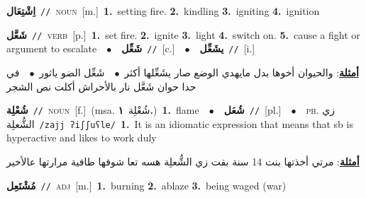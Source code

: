 \documentclass[10pt,a4paper,twoside]{article} %
\begin{document}
\begin{multicols}{2}
{\setlength\topsep{0pt}\textbf{\foreignlanguage{arabic}{اِشْتِعَال}}\ {\color{gray}\texttt{//}\color{black}}\ \textsc{noun}\ [m.]\ \textbf{1.}~setting fire.  \textbf{2.}~kindling  \textbf{3.}~igniting  \textbf{4.}~ignition\ } \vspace{2mm}

{\setlength\topsep{0pt}\textbf{\foreignlanguage{arabic}{شَعَّل}}\ {\color{gray}\texttt{//}\color{black}}\ \textsc{verb}\ [p.]\ \textbf{1.}~set fire.  \textbf{2.}~ignite  \textbf{3.}~light  \textbf{4.}~switch on.  \textbf{5.}~cause a fight or argument to escalate\ \ $\bullet$\ \ \setlength\topsep{0pt}\textbf{\foreignlanguage{arabic}{شَعِّل}}\ {\color{gray}\texttt{//}\color{black}}\ [c.]\ \ $\bullet$\ \ \setlength\topsep{0pt}\textbf{\foreignlanguage{arabic}{يشَعِّل}}\ {\color{gray}\texttt{//}\color{black}}\ [i.]\  \begin{flushright}\color{gray}\foreignlanguage{arabic}{\textbf{\underline{\foreignlanguage{arabic}{أمثلة}}}: والحيوان أخوها بدل مايهدي الوضع صار يشَعِّلها أكثر\ $\bullet$\ \  شَعِّل الضو ياثور\ $\bullet$\ \  في حدا حوان شَعَّل نار بالأحراش أكلت نص الشجر}\end{flushright}\color{black}} \vspace{2mm}

{\setlength\topsep{0pt}\textbf{\foreignlanguage{arabic}{شُعْلِة}}\ {\color{gray}\texttt{//}\color{black}}\ \textsc{noun}\ [f.]\ \color{gray}(msa. \foreignlanguage{arabic}{شُعْلِة}~\foreignlanguage{arabic}{\textbf{١.}})\color{black}\ \textbf{1.}~flame\ \ $\bullet$\ \ \setlength\topsep{0pt}\textbf{\foreignlanguage{arabic}{شُعَل}}\ {\color{gray}\texttt{//}\color{black}}\ [pl.]\ \ $\bullet$\ \ \textsc{ph.} \color{gray} \foreignlanguage{arabic}{زي الشُّعلِة}\color{black}\ {\color{gray}\texttt{/{\sffamily zajj ʔiʃʃuʕle}/}\color{black}}\ \textbf{1.}~It is an idiomatic expression that means that sb is hyperactive and likes to work duly\  \begin{flushright}\color{gray}\foreignlanguage{arabic}{\textbf{\underline{\foreignlanguage{arabic}{أمثلة}}}: مرتي أخذتها بنت 14 سنة بقت زي الشُّعلِة هسه تعا شوفها طافية مرارتها عالأخير}\end{flushright}\color{black}} \vspace{2mm}

{\setlength\topsep{0pt}\textbf{\foreignlanguage{arabic}{مُشْتَعِل}}\ {\color{gray}\texttt{//}\color{black}}\ \textsc{adj}\ [m.]\ \textbf{1.}~burning  \textbf{2.}~ablaze  \textbf{3.}~being waged (war)\ } \vspace{2mm}


\end{multicols}
\end{document}
